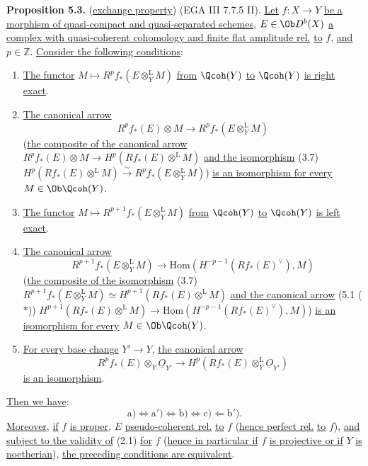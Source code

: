 \textbf{Proposition 5.3.} (\uline{exchange property}) (EGA III 7.7.5 II). \uline{Let} \(f:X\to Y\) \uline{be a morphism of quasi-compact and quasi-separated schemes}, \(E\in\Ob D^b(X)\) \uline{a complex with quasi-coherent cohomology and finite flat amplitude rel.} \uline{to} \(f\), \uline{and} \(p\in\mathbb Z\). \uline{Consider the following conditions}:
\begin{enumerate}[label=\alph*)]
\item[a)] \uline{The functor} \(M\mapsto R^pf_*(E\otimes_Y^{\mathrm L}M)\) \uline{from} \(\Qcoh(Y)\) \uline{to} \(\Qcoh(Y)\) \uline{is right exact}.
\item[a')] \uline{The canonical arrow}
\[
 R^pf_*(E)\otimes M\longrightarrow R^pf_*(E\otimes_Y^{\mathrm L}M)
\]
(\uline{the composite of the canonical arrow} \(R^pf_*(E)\otimes M\longrightarrow H^p(Rf_*(E)\otimes^{\mathrm L}M)\) \uline{and the isomorphism} (3.7) \(H^p(Rf_*(E)\otimes^{\mathrm L}M)\xrightarrow{\sim}R^pf_*(E\otimes_Y^{\mathrm L}M)\)) \uline{is an isomorphism for every} \(M\in\Ob\Qcoh(Y)\).
\item[b)] \uline{The functor} \(M\mapsto R^{p+1}f_*(E\otimes_Y^{\mathrm L}M)\) \uline{from} \(\Qcoh(Y)\) \uline{to} \(\Qcoh(Y)\) \uline{is left exact}.
\item[b')] \uline{The canonical arrow}
\[
 R^{p+1}f_*(E\otimes_Y^{\mathrm L}M)\longrightarrow\underline{\mathrm{Hom}}(H^{-p-1}(Rf_*(E)^{\vee}),M)
\]
(\uline{the composite of the isomorphism} (3.7) \(R^{p+1}f_*(E\otimes_Y^{\mathrm L}M)\simeq H^{p+1}(Rf_*(E)\otimes^{\mathrm L}M)\) \uline{and the canonical arrow} (5.1 (\(*\))) \(H^{p+1}(Rf_*(E)\otimes^{\mathrm L}M)\longrightarrow\underline{\mathrm{Hom}}(H^{-p-1}(Rf_*(E)^{\vee}),M)\)) \uline{is an isomorphism for every} \(M\in\Ob\Qcoh(Y)\).
%
\item[c)]
\uline{For every base change} \(Y'\to Y\), \uline{the canonical arrow}
\[
 R^pf_*(E)\otimes_Y\underline{O}_{Y'}\longrightarrow H^p(Rf_*(E)\otimes_Y^{\mathrm L}\underline{O}_{Y'})
\]
\uline{is an isomorphism}.
\end{enumerate}
\uline{Then we have}:
\[
 \mathrm a)\Longleftrightarrow\mathrm a')\Longleftrightarrow\mathrm b)\Longleftrightarrow\mathrm c)\Longleftarrow\mathrm b').
\]
\uline{Moreover}, \uline{if} \(f\) \uline{is proper}, \(E\) \uline{pseudo-coherent rel.} \uline{to} \(f\) (\uline{hence perfect rel.} \uline{to} \(f\)), \uline{and subject to the validity of} (2.1) \uline{for} \(f\) (\uline{hence in particular if} \(f\) \uline{is projective or if} \(Y\) \uline{is noetherian}), \uline{the preceding conditions are equivalent}.

